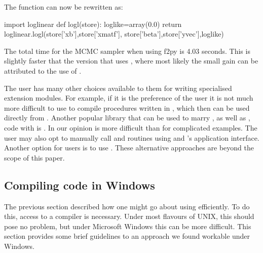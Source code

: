 \documentclass[article]{jss}
\begin{document}
The function  can now be rewritten as:

\begin{Code}
import loglinear
def logl(store):
	loglike=array(0.0)     
	return loglinear.logl(store['xb'],store['xmatf'], 
                  store['beta'],store['yvec'],loglike)
\end{Code}

The total time for the MCMC sampler when using f2py is 4.03 seconds.
This is slightly faster that the version that uses , where most
likely the small gain can be attributed to the use of .

The user has many other choices available to them for writing
specialised extension modules. For example, if it is the preference of
the user it is not much more difficult to use  to compile
procedures written in , which then can be used directly
from . Another popular library that can be used to
marry , as well as , code with
 is . In our opinion  is more
difficult than  for complicated examples. The user may also
opt to manually call  and  routines using
 and 's  application
interface. Another option for  users is to use
 . These alternative approaches are beyond
the scope of this paper.


\subsection{Compiling code in Windows}
\label{CompilingWindows}

The previous section described how one might go about using
 efficiently. To do this, access to a compiler is
necessary. Under most flavours of UNIX, this should pose no problem,
but under Microsoft Windows this can be more difficult. This section
provides some brief guidelines to an approach we found workable under
Windows.
\end{document}
